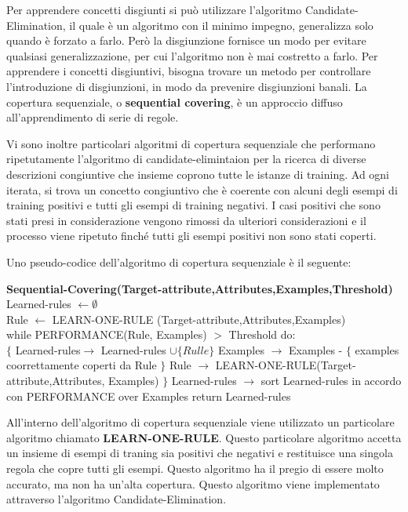 \documentclass[a4paper]{extarticle}
\begin{document}
Per apprendere concetti disgiunti si può utilizzare l'algoritmo Candidate-Elimination, il quale è un algoritmo con il minimo impegno, generalizza solo quando è forzato a farlo. Però la disgiunzione fornisce un modo per evitare qualsiasi generalizzazione, per cui l'algoritmo non è mai costretto a farlo. Per apprendere i concetti disgiuntivi, bisogna trovare un metodo per controllare l'introduzione di disgiunzioni, in modo da prevenire disgiunzioni banali. La copertura sequenziale, o \textbf{sequential covering}, è un approccio diffuso all'apprendimento di serie di regole.

Vi sono inoltre particolari algoritmi di copertura sequenziale che performano ripetutamente l'algoritmo di candidate-elimintaion per la ricerca di diverse descrizioni congiuntive che insieme coprono tutte le istanze di training. Ad ogni iterata, si trova un concetto congiuntivo che è coerente con alcuni degli esempi di training positivi e tutti gli esempi di training negativi. I casi positivi che sono stati presi in considerazione vengono rimossi da ulteriori considerazioni e il processo viene ripetuto finché tutti gli esempi positivi non sono stati coperti.

Uno pseudo-codice dell'algoritmo di copertura sequenziale è il seguente:

\textbf{Sequential-Covering(Target-attribute,Attributes,Examples,Threshold)}\\
Learned-rules $\leftarrow \emptyset$\\
Rule $\leftarrow$ LEARN-ONE-RULE (Target-attribute,Attributes,Examples)\\
while PERFORMANCE(Rule, Examples) $>$ Threshold do:\\
$\{$
Learned-rules$\rightarrow$ Learned-rules $\cup \{ Rulle \}$
Examples $\rightarrow$ Examples - $\{$ examples coorrettamente coperti da Rule $\}$
Rule $\rightarrow$ LEARN-ONE-RULE(Target-attribute,Attributes, Examples)
$\}$
Learned-rules $\rightarrow$ sort Learned-rules in accordo con PERFORMANCE over Examples
return Learned-rules


All'interno dell'algoritmo di copertura sequenziale viene utilizzato un particolare algoritmo chiamato \textbf{LEARN-ONE-RULE}. Questo particolare algoritmo accetta un insieme di esempi di traning sia positivi che negativi e restituisce una singola regola che copre tutti gli esempi. Questo algoritmo ha il pregio di essere molto accurato, ma non ha un'alta copertura. Questo algoritmo viene implementato attraverso l'algoritmo Candidate-Elimination. 
\end{document}
